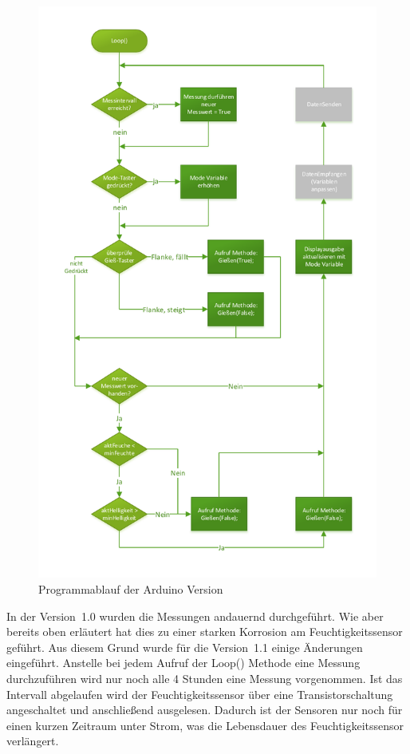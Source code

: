 	
\begin{figure}[h]
	\centering
	\includegraphics[width=\linewidth]{diagramme/AV_Ablaufdiagramm.pdf}
	\caption{Programmablauf der Arduino Version}
	\label{fig-SV_Ablaufplan}
\end{figure}
		
	In der Version~1.0 wurden die Messungen andauernd durchgeführt. 
	Wie aber bereits oben erläutert hat dies zu einer starken Korrosion am Feuchtigkeitssensor geführt. 
	Aus diesem Grund wurde für die Version~1.1 einige Änderungen eingeführt. 
	Anstelle bei jedem Aufruf der Loop() Methode eine Messung durchzuführen wird nur noch alle 4 Stunden eine Messung vorgenommen. 
	Ist das Intervall abgelaufen wird der Feuchtigkeitssensor über eine Transistorschaltung angeschaltet und anschließend ausgelesen. 
	Dadurch ist der Sensoren nur noch für einen kurzen Zeitraum unter Strom, was die Lebensdauer des Feuchtigkeitssensor verlängert.
		
